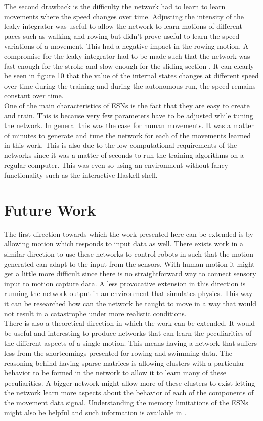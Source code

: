 \documentclass[letterpaper,9pt]{article}
\begin{document}
The second drawback is the difficulty the network had to learn to learn movements where the speed changes over time. Adjusting the intensity of the leaky integrator was useful to allow the network to learn motions of different paces such as walking and rowing but didn't prove useful to learn the speed variations of a movement. This had a negative impact in the rowing motion. A compromise for the leaky integrator had to be made such that the network was fast enough for the stroke and slow enough for the sliding section . It can clearly be seen in figure 10 that the value of the internal states changes at different speed over time during the training and during the autonomous run, the speed remains constant over time.\\

One of the main characteristics of ESNs is the fact that they are easy to create and train. This is because very few parameters have to be adjusted while tuning the network. In general this was the case for human movements. It was a matter of minutes to generate and tune the network for each of the movements learned in this work. This is also due to the low computational requirements of the networks since it was a matter of seconds to run the training algorithms on a regular computer. This was even so using an environment without fancy functionality such as the interactive Haskell shell.

\section{Future Work}

The first direction towards which the work presented here can be extended is by allowing motion which responds to input data as well. There exists work in a similar direction to use these networks to control robots in \cite{ESNRobots} such that the motion generated can adapt to the input from the sensors. With human motion it might get a little more difficult since there is no straightforward way to connect sensory input to motion capture data. A less provocative extension in this direction is running the network output in an environment that simulates physics. This way it can be researched how can the network be taught to move in a way that would not result in a catastrophe under more realistic conditions.\\

There is also a theoretical direction in which the work can be extended. It would be useful and interesting to produce networks that can learn the peculiarities of the different aspects of a single motion. This means having a network that suffers less from the shortcomings presented for rowing and swimming data. The reasoning behind having sparse matrices is allowing clusters with a particular behavior to be formed in the network to allow it to learn many of these peculiarities. A bigger network might allow more of these clusters to exist letting the network learn more aspects about the behavior of each of the components of the movement data signal. Understanding the memory limitations of the ESNs might also be helpful and such information is available in \cite{ESNMemory}.\\
\end{document}
